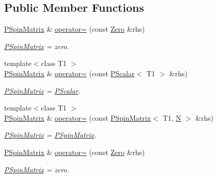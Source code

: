 \subsection*{Public Member Functions}
\begin{DoxyCompactItemize}
\item 
\mbox{\hyperlink{classENSEM_1_1PSpinMatrix}{P\+Spin\+Matrix}} \& \mbox{\hyperlink{classENSEM_1_1PSpinMatrix_a2a776d9189f8d6fa8f9d9bc6758713c9}{operator=}} (const \mbox{\hyperlink{structENSEM_1_1Zero}{Zero}} \&rhs)
\begin{DoxyCompactList}\small\item\em \mbox{\hyperlink{classENSEM_1_1PSpinMatrix}{P\+Spin\+Matrix}} = zero. \end{DoxyCompactList}\item 
{\footnotesize template$<$class T1 $>$ }\\\mbox{\hyperlink{classENSEM_1_1PSpinMatrix}{P\+Spin\+Matrix}} \& \mbox{\hyperlink{classENSEM_1_1PSpinMatrix_a0b0ca395b4662cc2f1a18724aa8354e4}{operator=}} (const \mbox{\hyperlink{classENSEM_1_1PScalar}{P\+Scalar}}$<$ T1 $>$ \&rhs)
\begin{DoxyCompactList}\small\item\em \mbox{\hyperlink{classENSEM_1_1PSpinMatrix}{P\+Spin\+Matrix}} = \mbox{\hyperlink{classENSEM_1_1PScalar}{P\+Scalar}}. \end{DoxyCompactList}\item 
{\footnotesize template$<$class T1 $>$ }\\\mbox{\hyperlink{classENSEM_1_1PSpinMatrix}{P\+Spin\+Matrix}} \& \mbox{\hyperlink{classENSEM_1_1PSpinMatrix_a0346425dd32cab35d2f76c9d5cca8533}{operator=}} (const \mbox{\hyperlink{classENSEM_1_1PSpinMatrix}{P\+Spin\+Matrix}}$<$ T1, \mbox{\hyperlink{adat__devel_2lib_2hadron_2operator__name__util_8cc_a7722c8ecbb62d99aee7ce68b1752f337}{N}} $>$ \&rhs)
\begin{DoxyCompactList}\small\item\em \mbox{\hyperlink{classENSEM_1_1PSpinMatrix}{P\+Spin\+Matrix}} = \mbox{\hyperlink{classENSEM_1_1PSpinMatrix}{P\+Spin\+Matrix}}. \end{DoxyCompactList}\item 
\mbox{\hyperlink{classENSEM_1_1PSpinMatrix}{P\+Spin\+Matrix}} \& \mbox{\hyperlink{classENSEM_1_1PSpinMatrix_a2a776d9189f8d6fa8f9d9bc6758713c9}{operator=}} (const \mbox{\hyperlink{structENSEM_1_1Zero}{Zero}} \&rhs)
\begin{DoxyCompactList}\small\item\em \mbox{\hyperlink{classENSEM_1_1PSpinMatrix}{P\+Spin\+Matrix}} = zero. \end{DoxyCompactList}\item 

\end{DoxyCompactItemize}
